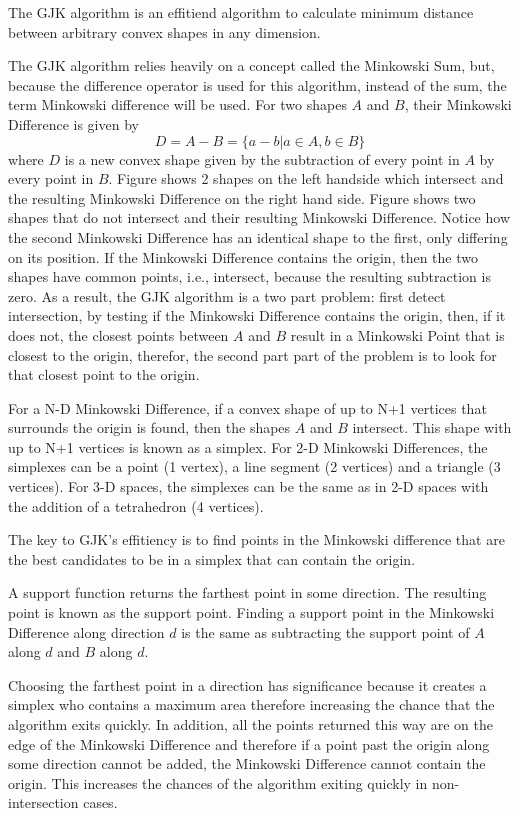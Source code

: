 \par The \ac{GJK} algorithm is an effitiend algorithm to calculate minimum distance between arbitrary convex shapes in any dimension. 
\par The \ac{GJK} algorithm relies heavily on a concept called the Minkowski Sum, but, because the difference operator is used for this algorithm, instead of the sum, the term Minkowski difference will be used. For two shapes $A$ and $B$, their Minkowski Difference is given by
\begin{equation}
    D = A - B = \{a-b|a\in A, b\in B\}
\end{equation}
where $D$ is a new convex shape given by the subtraction of every point in $A$ by every point in $B$.
Figure  shows 2 shapes on the left handside which intersect and the resulting Minkowski Difference on the right hand side. Figure shows two shapes that do not intersect and their resulting Minkowski Difference. Notice how the second Minkowski Difference has an identical shape to the first, only differing on its position.
If the Minkowski Difference contains the origin, then the two shapes have common points, i.e., intersect, because the resulting subtraction is zero. As a result, the \ac{GJK} algorithm is a two part problem: first detect intersection, by testing if the Minkowski Difference contains the origin, then, if it does not, the closest points between $A$ and $B$ result in a Minkowski Point that is closest to the origin, therefor, the second part part of the problem is to look for that closest point to the origin.
\par For a N-D Minkowski Difference, if a convex shape of up to N+1 vertices that surrounds the origin is found, then the shapes $A$ and $B$ intersect. This shape with up to N+1 vertices is known as a simplex. For 2-D Minkowski Differences, the simplexes can be a point (1 vertex), a line segment (2 vertices) and a triangle (3 vertices). For 3-D spaces, the simplexes can be the same as in 2-D spaces with the addition of a tetrahedron (4 vertices).
\par The key to \ac{GJK}'s effitiency is to find points in the Minkowski difference that are the best candidates to be in a simplex that can contain the origin. 
\par A support function returns the farthest point in some direction. The resulting point is known as the support point. Finding a support point in the Minkowski Difference along direction $d$ is the same as subtracting the support point of $A$ along $d$ and $B$ along $d$. 
\par Choosing the farthest point in a direction has significance because it creates a simplex who contains a maximum area therefore increasing the chance that the algorithm exits quickly. In addition, all the points returned this way are on the edge of the Minkowski Difference and therefore if a point past the origin along some direction cannot be added, the Minkowski Difference cannot contain the origin. This increases the chances of the algorithm exiting quickly in non-intersection cases.


